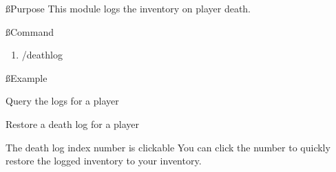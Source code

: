 
\ss{Purpose}
This module logs the inventory on player death.

\ss{Command}
\begin{enumerate}
    \item /deathlog
\end{enumerate}


\ss{Example}
\begin{example}{Query the logs for a player}
\end{example}

\begin{example}{Restore a death log for a player}
\end{example}

\begin{tips}{The death log index number is clickable}
    You can click the number to quickly restore the logged inventory to your inventory.
\end{tips}